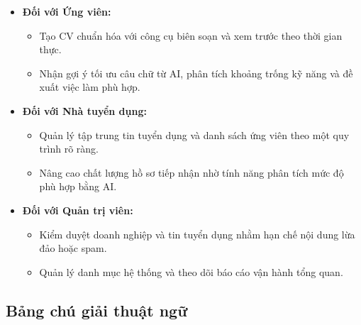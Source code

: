 \begin{itemize}
    \item \textbf{Đối với Ứng viên:}
    \begin{itemize}
        \item Tạo CV chuẩn hóa với công cụ biên soạn và xem trước theo thời gian thực.
        \item Nhận gợi ý tối ưu câu chữ từ AI, phân tích khoảng trống kỹ năng và đề xuất việc làm phù hợp.
    \end{itemize}
    \item \textbf{Đối với Nhà tuyển dụng:}
    \begin{itemize}
        \item Quản lý tập trung tin tuyển dụng và danh sách ứng viên theo một quy trình rõ ràng.
        \item Nâng cao chất lượng hồ sơ tiếp nhận nhờ tính năng phân tích mức độ phù hợp bằng AI.
    \end{itemize}
    \item \textbf{Đối với Quản trị viên:}
    \begin{itemize}
        \item Kiểm duyệt doanh nghiệp và tin tuyển dụng nhằm hạn chế nội dung lừa đảo hoặc spam.
        \item Quản lý danh mục hệ thống và theo dõi báo cáo vận hành tổng quan.
    \end{itemize}
\end{itemize}

\subsection{Bảng chú giải thuật ngữ}

